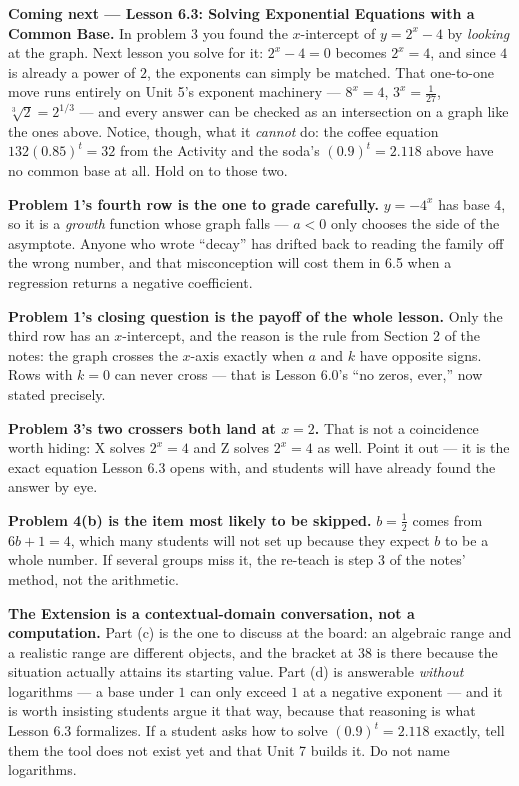 \documentclass[10pt]{article}
\begin{document}
\begin{spiralbox}
\textbf{Coming next --- Lesson 6.3: Solving Exponential Equations with a Common Base.} In problem 3
you found the $x$-intercept of $y=2^{x}-4$ by \emph{looking} at the graph. Next lesson you solve for
it: $2^{x}-4=0$ becomes $2^{x}=4$, and since $4$ is already a power of $2$, the exponents can simply
be matched. That one-to-one move runs entirely on Unit 5's exponent machinery --- $8^{x}=4$,
$3^{x}=\frac{1}{27}$, $\sqrt[3]{2}=2^{1/3}$ --- and every answer can be checked as an intersection on
a graph like the ones above. Notice, though, what it \emph{cannot} do: the coffee equation
$132(0.85)^{t}=32$ from the Activity and the soda's $(0.9)^{t}=2.118$ above have no common base at
all. Hold on to those two.
\end{spiralbox}

\begin{teachernote}
\textbf{Problem 1's fourth row is the one to grade carefully.} $y=-4^{x}$ has base $4$, so it is a
\emph{growth} function whose graph falls --- $a<0$ only chooses the side of the asymptote. Anyone who
wrote ``decay'' has drifted back to reading the family off the wrong number, and that misconception
will cost them in 6.5 when a regression returns a negative coefficient.

\textbf{Problem 1's closing question is the payoff of the whole lesson.} Only the third row has an
$x$-intercept, and the reason is the rule from Section 2 of the notes: the graph crosses the $x$-axis
exactly when $a$ and $k$ have opposite signs. Rows with $k=0$ can never cross --- that is Lesson 6.0's
``no zeros, ever,'' now stated precisely.

\textbf{Problem 3's two crossers both land at $x=2$.} That is not a coincidence worth hiding: X solves
$2^{x}=4$ and Z solves $2^{x}=4$ as well. Point it out --- it is the exact equation Lesson 6.3 opens
with, and students will have already found the answer by eye.

\textbf{Problem 4(b) is the item most likely to be skipped.} $b=\frac12$ comes from
$6b+1=4$, which many students will not set up because they expect $b$ to be a whole number. If several
groups miss it, the re-teach is step 3 of the notes' method, not the arithmetic.

\textbf{The Extension is a contextual-domain conversation, not a computation.} Part (c) is the one to
discuss at the board: an algebraic range and a realistic range are different objects, and the bracket
at $38$ is there because the situation actually attains its starting value. Part (d) is answerable
\emph{without} logarithms --- a base under $1$ can only exceed $1$ at a negative exponent --- and it is
worth insisting students argue it that way, because that reasoning is what Lesson 6.3 formalizes. If a
student asks how to solve $(0.9)^{t}=2.118$ exactly, tell them the tool does not exist yet and that
Unit 7 builds it. Do not name logarithms.
\end{teachernote}
\end{document}
